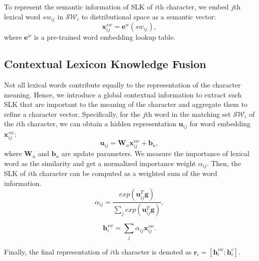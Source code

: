 \documentclass[conference]{IEEEtran}
\begin{document}
To represent the semantic information of SLK of $i$th character, 
we embed $j$th lexical word ${{sw}}_{ij}$ in $\mathcal{SW}_i$ to distributional space as a semantic vector:
\begin{equation}
    \textbf{x}^{{sw}}_{ij} = \textbf{e}^w({{sw}}_{ij}),
\end{equation}
where $\textbf{e}^w$ is a pre-trained word embedding lookup table. 




\subsection{Contextual Lexicon Knowledge Fusion}
Not all lexical words contribute equally to the representation of the character meaning.
Hence, we introduce a global contextual information to extract such SLK
that are important to the meaning of the character 
and aggregate them to refine a character
vector.
Specifically, for the $j$th word in the matching set $\mathcal{SW}_i$ of the $i$th character,
we can obtain a hidden representation $\textbf{u}_{ij}$
for word embedding $\textbf{x}^{sw}_{ij}$:
\begin{equation}
    \textbf{u}_{ij} = \textbf{W}_u \textbf{x}^{{sw}}_{ij} + \textbf{b}_u,
\end{equation}
where $\textbf{W}_u$ and $\textbf{b}_u$ are update parameters. 
We measure the importance of lexical word as the similarity 
and get a normalized importance weight $\alpha_{ij}$.
Then, 
the SLK of $i$th character can be computed as
a weighted sum of the word information.
\begin{equation}
    \alpha_{ij} = \frac{exp(\textbf{u}_{ij}^{T} \textbf{g})} 
    {\sum_j exp(\textbf{u}_{ij}^{T} \textbf{g})},
\end{equation}

\begin{equation}
    \textbf{h}^{{sw}}_i = \sum_j \alpha_{ij} \textbf{x}^{{sw}}_{ij}.
\end{equation}



Finally, the final representation of $i$th character is denoted as $\textbf{r}_i = [\textbf{h}^{sw}_i; \textbf{h}^c_i]$.
\end{document}
